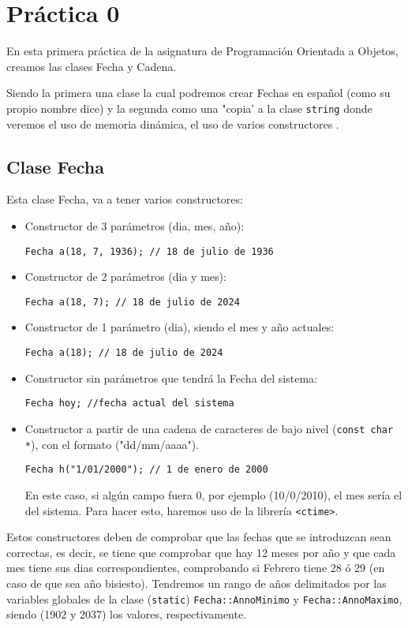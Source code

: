 \chapter{Práctica 0}
En esta primera práctica de la asignatura de Programación Orientada a Objetos, 
creamos las clases Fecha y Cadena.

Siendo la primera una clase la cual podremos crear Fechas en español (como su propio nombre dice)
y la segunda como una "copia' a la clase \texttt{string} donde veremos el uso de
memoria dinámica, el uso de varios constructores .

\section{Clase Fecha}
Esta clase Fecha, va a tener varios constructores:
\begin{itemize}
    \item Constructor de 3 parámetros (dia, mes, año):
        \begin{center}
            \texttt{Fecha a(18, 7, 1936); // 18 de julio de 1936}
        \end{center}
    \item Constructor de 2 parámetros (dia y mes):
        \begin{center}
            \texttt{Fecha a(18, 7); // 18 de julio de 2024}
        \end{center}
    \item Constructor de 1 parámetro (dia), siendo el mes y año actuales:
        \begin{center}
            \texttt{Fecha a(18); // 18 de julio de 2024}
        \end{center}
    \item Constructor sin parámetros que tendrá la Fecha del sistema:
    \begin{center}
        \texttt{Fecha hoy; //fecha actual del sistema}
    \end{center}
    \item Constructor a partir de una cadena de caracteres de bajo nivel (\texttt{const char *}),
    con el formato  ("dd/mm/aaaa").
    \begin{center}
        \texttt{Fecha h("1/01/2000"); // 1 de enero de 2000}
    \end{center}
    En este caso, si algún campo fuera 0, por ejemplo (10/0/2010), el mes sería el del sistema.
    Para hacer esto, haremos uso de la librería \texttt{<ctime>}.
\end{itemize}
Estos constructores deben de comprobar que las fechas que se introduzcan sean correctas, es decir, se tiene
que comprobar que hay 12 meses por año y que cada mes tiene sus dias correspondientes, comprobando si 
Febrero tiene 28 ó 29 (en caso de que sea año bisiesto).
Tendremos un rango de años delimitados por las variables globales de la clase (\texttt{static})
\texttt{Fecha::AnnoMinimo} y \texttt{Fecha::AnnoMaximo}, siendo
(1902 y 2037) los valores, respectivamente.

